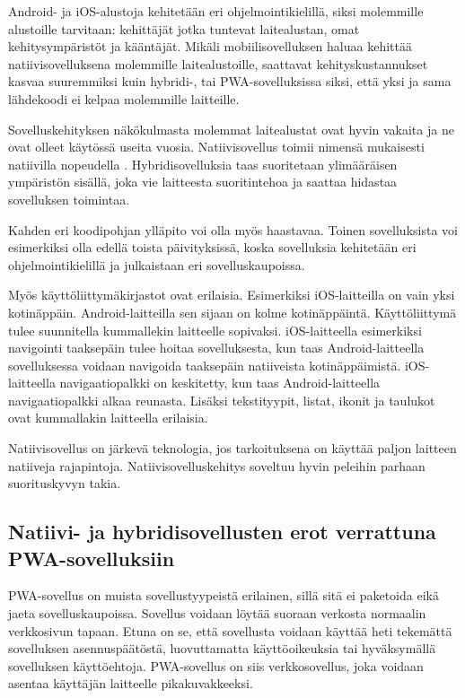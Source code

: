 \documentclass{tktltiki}
\begin{document}
Android- ja iOS-alustoja kehitetään eri ohjelmointikielillä, siksi molemmille alustoille tarvitaan: kehittäjät jotka tuntevat laitealustan, omat kehitysympäristöt ja kääntäjät. Mikäli mobiilisovelluksen haluaa kehittää natiivisovelluksena molemmille laitealustoille, saattavat kehityskustannukset kasvaa suuremmiksi kuin hybridi-, tai PWA-sovelluksissa siksi, että yksi ja sama lähdekoodi ei kelpaa molemmille laitteille. 

Sovelluskehityksen näkökulmasta molemmat laitealustat ovat hyvin vakaita ja ne ovat olleet käytössä useita vuosia. Natiivisovellus toimii nimensä mukaisesti natiivilla nopeudella \cite{6588524}. Hybridisovelluksia taas suoritetaan ylimääräisen ympäristön sisällä, joka vie laitteesta suoritintehoa ja saattaa hidastaa sovelluksen toimintaa. 

Kahden eri koodipohjan ylläpito voi olla myös haastavaa. Toinen sovelluksista voi esimerkiksi olla edellä toista päivityksissä, koska sovelluksia kehitetään eri ohjelmointikielillä ja julkaistaan eri sovelluskaupoissa.

Myös käyttöliittymäkirjastot ovat erilaisia. Esimerkiksi iOS-laitteilla on vain yksi kotinäppäin. Android-laitteilla sen sijaan on kolme kotinäppäintä. \cite{Sojka} Käyttöliittymä tulee suunnitella kummallekin laitteelle sopivaksi. iOS-laitteella esimerkiksi navigointi taaksepäin tulee hoitaa sovelluksesta, kun taas Android-laitteella sovelluksessa voidaan navigoida taaksepäin natiiveista kotinäppäimistä. iOS-laitteella navigaatiopalkki on keskitetty, kun taas Android-laitteella navigaatiopalkki alkaa reunasta. Lisäksi tekstityypit, listat, ikonit ja taulukot ovat kummallakin laitteella erilaisia.

Natiivisovellus on järkevä teknologia, jos tarkoituksena on käyttää paljon laitteen natiiveja rajapintoja. Natiivisovelluskehitys soveltuu hyvin peleihin parhaan suorituskyvyn takia. 

\subsection{Natiivi- ja hybridisovellusten erot verrattuna PWA-sovelluksiin}

PWA-sovellus on muista sovellustyypeistä erilainen, sillä sitä ei paketoida eikä jaeta sovelluskaupoissa. Sovellus voidaan löytää suoraan verkosta normaalin verkkosivun tapaan. Etuna on se, että sovellusta voidaan käyttää heti tekemättä sovelluksen asennuspäätöstä, luovuttamatta käyttöoikeuksia tai hyväksymällä sovelluksen käyttöehtoja. PWA-sovellus on siis verkkosovellus, joka voidaan asentaa käyttäjän laitteelle pikakuvakkeeksi. 
\end{document}
